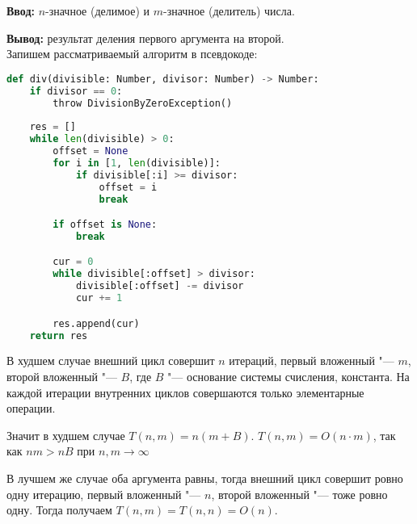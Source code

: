 

\date{}
\author{}


\textbf{Ввод:} $n$-значное (делимое) и $m$-значное (делитель) числа.

\textbf{Вывод:} результат деления первого аргумента на второй. \\

Запишем рассматриваемый алгоритм в псевдокоде:
\begin{lstlisting}[language=Python]
def div(divisible: Number, divisor: Number) -> Number:
    if divisor == 0:
        throw DivisionByZeroException()
    
    res = []
    while len(divisible) > 0:
        offset = None
        for i in [1, len(divisible)]:
            if divisible[:i] >= divisor:
                offset = i
                break

        if offset is None:
            break

        cur = 0
        while divisible[:offset] > divisor:
            divisible[:offset] -= divisor
            cur += 1

        res.append(cur)
    return res
\end{lstlisting}

В худшем случае внешний цикл совершит $n$ итераций, первый вложенный "--- $m$, второй вложенный "--- $B$, где $B$ "--- основание системы счисления, константа.
На каждой итерации внутренних циклов совершаются только элементарные операции.

Значит в худшем случае $T(n, m) = n(m + B)$.
$T(n, m) = O(n \cdot m)$, так как $nm > nB$ при $n, m \to \infty$

В лучшем же случае оба аргумента равны, тогда внешний цикл совершит ровно одну итерацию, первый вложенный "--- $n$, второй вложенный "--- тоже ровно одну. Тогда получаем $T(n, m) = T(n, n) = O(n)$.


